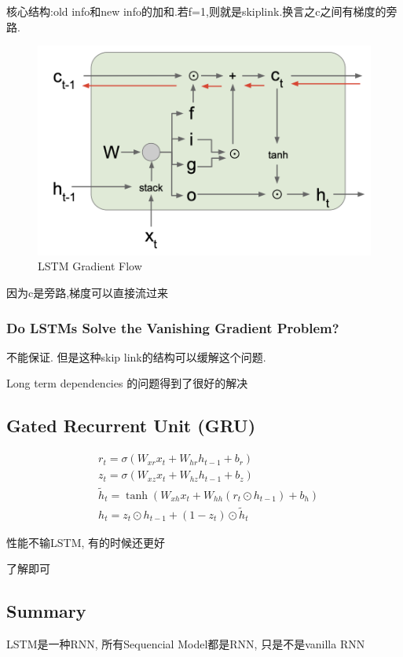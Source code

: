 	核心结构:old info和new info的加和.若f=1,则就是skiplink.换言之c之间有梯度的旁路.

	\begin{figure}[htbp]
		\centering
		\includegraphics[scale=0.35]{figures/lstm_grad_flow.png}
		\caption{LSTM Gradient Flow}
	\end{figure}

	因为c是旁路,梯度可以直接流过来

	\subsubsection{Do LSTMs Solve the Vanishing Gradient Problem?}

	不能保证. 但是这种skip link的结构可以缓解这个问题.

	Long term dependencies 的问题得到了很好的解决

	\subsection{Gated Recurrent Unit (GRU)}

	\[
	\begin{aligned}
		&r_{t} =\sigma(W_{xr}x_t+W_{hr}h_{t-1}+b_r)  \\
		&z_{t} =\sigma(W_{xz}x_t+W_{hz}h_{t-1}+b_z)  \\
		&\tilde{h}_{t} =\tanh(W_{xh}x_t+W_{hh}(r_t\odot h_{t-1})+b_h)  \\
		&h_t =z_t\odot h_{t-1}+(1-z_t)\odot\tilde{h}_t 
	\end{aligned}	
	\]

	性能不输LSTM, 有的时候还更好

	了解即可

	\subsection{Summary}

	LSTM是一种RNN, 所有Sequencial Model都是RNN, 只是不是vanilla RNN